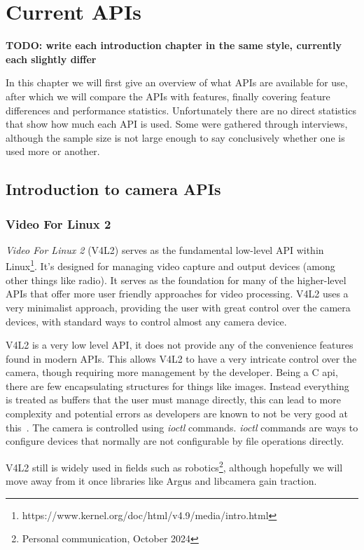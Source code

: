 \chapter{Current APIs\label{section:currentAPIs}}
\textbf{TODO: write each introduction chapter in the same style, currently
each slightly differ}

In this chapter we will first give an overview of what APIs are available for
use, after which we will compare the APIs with features, finally covering
feature differences and performance statistics. Unfortunately there are no
direct statistics that show how much each API is used. Some were gathered
through interviews, although the sample size is not large enough to say
conclusively whether one is used more or another.

\section{Introduction to camera APIs}
\subsection{Video For Linux 2}\label{section:v4l2}
\textit{Video For Linux 2} (V4L2) serves as the fundamental low-level API
within Linux\footnote{https://www.kernel.org/doc/html/v4.9/media/intro.html}.
It's designed for managing video capture and output devices (among other things
like radio). It serves as the foundation for many of the higher-level APIs that
offer more user friendly approaches for video processing. V4L2 uses a very
minimalist approach, providing the user with great control over the camera
devices, with standard ways to control almost any camera device.

V4L2 is a very low level API, it does not provide any of the convenience
features found  in modern APIs. This allows V4L2 to have a very intricate
control over the camera, though requiring more management by the developer.
Being a C api, there are few encapsulating structures for things like images.
Instead everything is treated as buffers that the user must manage directly,
this can lead to more complexity and potential errors as developers are known
to not be very good at this~\cite{van2012memory}. The camera is controlled
using \textit{ioctl} commands. \textit{ioctl} commands are ways to configure
devices that normally are not configurable by file operations directly.

V4L2 still is widely used in fields such as robotics\footnote{Personal
communication, October 2024}, although hopefully we will move away from it once
libraries like Argus and libcamera gain traction.


